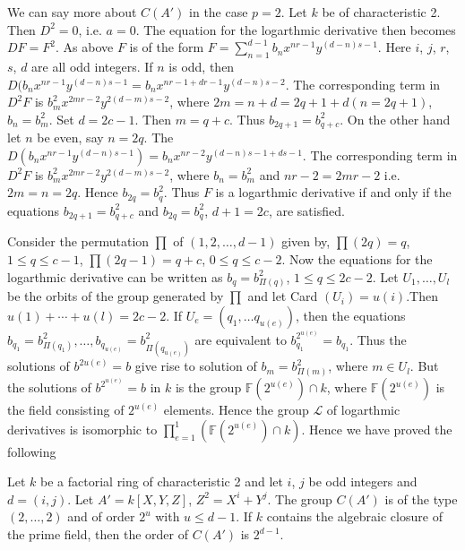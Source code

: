     We can say more about $C(A')$ in the case $p = 2$. Let $k$ be
    of characteristic 2. Then $D^2 = 0$, i.e. $a= 0$. The equation
    for the logarthmic derivative then becomes $DF = F^2$. As above
    $F$ is of the form $F = \sum\limits_{n = 1}^{d - 1} b_n x^{nr - 1}
    y^{(d - n) s - 1}$. Here $i$, $j$, $r$, $s$, $d$ are all odd integers. If
    $n$ is odd, then $D (b_n x^{nr - 1} y^{(d-n)s-1} = b_n x^{nr -
      1+dr-1} y^{(d-n) s - 2}$.
The corresponding term in $D^2 F$ is
    $b^2_m x^{2 mr - 2} y^{2(d-m)s-2}$, where $2m = n + d = 2q + 1+d
    (n = 2q +1)$, $b_n = b^2_m$. Set $d = 2c - 1$. Then $m = q+c$. Thus
    $b_{2q+1} = b^2_{q+c}$. On the other hand let $n$ be even, say $n
    = 2q$. The $D(b_n x^{nr -1} y^{(d-n)s-1}) = b_n x^{nr - 2}
    y^{(d-n)s-1+ds-1}$. The corresponding term in $D^2 F$ is $b^2_m
    x^{2m r-2} y^{2(d-m)s-2}$, where $b_n = b^2_m$ and $nr - 2 = 2
    mr-2 $ i.e. $2m = n = 2q$. Hence $b_{2q} = b^2_q$. Thus $F$ is a
    logarthmic derivative if and only if the equations $b_{2q +1} =
    b^2_{q+c}$ and $b_{2q} = b^2_q$, $d+1 = 2c$, are satisfied. 
    
    Consider the permutation $\prod $ of $(1, 2, \ldots , d - 1)$
    given by, $\prod (2q) = q$, $1 \le q \le c-1$, $\prod (2q - 1) = q+c$,
    $0 \le q \leq c-2$. Now the equations for the logarthmic derivative can be
    written as $b_q = b^2_{\Pi (q)}$, $1 \le q \le 2c - 2$. Let $U_1,
    \ldots, U_l$ be the orbits of the group generated by $\prod $
    and let Card $(U_i) = u(i) $.\pageoriginale Then $u(1)+ \cdots  +
    u(l) = 2c - 2 
    $. If $U_e = (q_1, \ldots q_{u(e)})$, then the equations $b_{q_1}
    = b^2_{\Pi (q_1)}, \ldots , b_{q_{u(e)}} = b^2_{\Pi (q_{u(e)})}$
    are equivalent to $b^{2^{u(e)}}_{q_1} = b_{q_1}$. Thus the
    solutions of $b^{2u (e)} = b$ give rise to solution of $b_m =
    b^2_{\Pi (m)}$, where $m \in U_l$. But the solutions of
    $b^{2^{u(e)}}= b $ in $k$ is the group $\mathbb{F}(2^{u(e)}) \cap
    k$, where $\mathbb{F} (2^{u(e)})$ is the field consisting of
    $2^{u(e)}$ elements. Hence the group $\mathscr{L}$ of logarthmic
    derivatives is isomorphic to $\prod\limits_{e = 1}^1 (\mathbb{F}
    (2^{u(e)} ) \cap k)$. Hence we have proved the following 
    
\begin{theorem}\label{chap3:thm4.2} %
Let $k$ be a factorial ring of characteristic 2 and let $i$, $j$ 
  be odd integers and $d = (i, j)$. Let $A' = k [X, Y, Z]$, $Z^2 = X^i
  + Y^j$. The group $C(A')$ is of the type $(2, \ldots , 2)$ and of order
  $2^u$ with $u \le d - 1$. If $k$ contains the algebraic closure of
  the prime field, then the order of $C(A') $ is $2^{d-1}$. 
    \end{theorem} 
       

